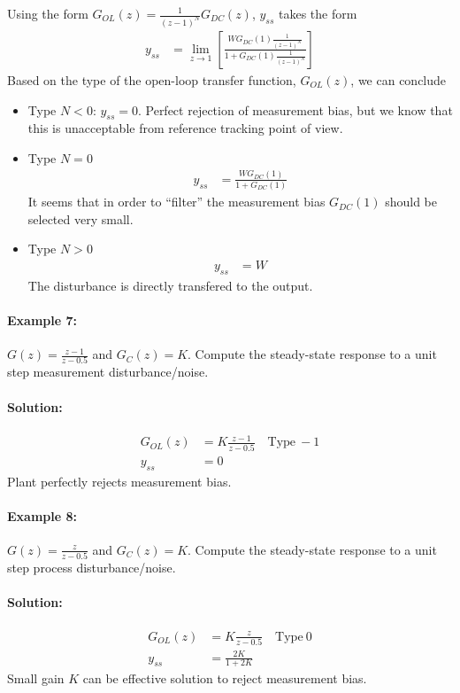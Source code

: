 \documentclass[twoside]{article}
\begin{document}
Using the form $G_{OL}(z) = \frac{1}{(z-1)^N} G_{DC}(z)$, $y_{ss}$
takes the form
%
\begin{align*}
  y_{ss} &= \lim_{z\to1} \left[ \frac{ W G_{DC}(1) \frac{1}{(z-1)^N}} {1 + G_{DC}(1) \frac{1}{(z-1)^N}}\right]  
\end{align*}
%
Based on the type of the open-loop transfer function, $G_{OL}(z)$,
we can conclude 
%
\begin{itemize}
 \item Type $N < 0$: $y_{ss} = 0$. Perfect rejection of measurement
   bias, but we know that this is unacceptable from reference tracking
   point of view.
 \item Type $N = 0$
%
\begin{align*}
  y_{ss} &= \frac{ W G_{DC}(1) } {1 + G_{DC}(1) } 
\end{align*}
%
It seems that in order to ``filter'' the measurement bias
$G_{DC}(1)$ should be selected very small.

\item Type $N > 0$
%
\begin{align*}
  y_{ss} &= W 
\end{align*}
%
The disturbance is directly transfered to the output. 

\end{itemize}
% 


\paragraph{Example 7:} $G(z) = \frac{z-1}{z-0.5}$ and $G_C(z) =
K$. Compute the steady-state response to a unit step
measurement disturbance/noise.

\paragraph{Solution:} 
%
\begin{align*}
G_{OL}(z) &= K \frac{z-1}{z-0.5} \quad \textrm{Type} \ -1
\\
y_{ss} &= 0
\end{align*}
%
Plant perfectly rejects measurement bias. 
%

\paragraph{Example 8:} $G(z) = \frac{z}{z-0.5}$ and $G_C(z) =
K$. Compute the steady-state response to a unit step
process disturbance/noise.

\paragraph{Solution:} 
%
\begin{align*}
G_{OL}(z) &= K \frac{z}{z-0.5} \quad \textrm{Type} \ 0
\\
y_{ss} &= \frac{ 2K  } {1 +2K } 
\end{align*}
%
Small gain $K$ can be effective solution to reject measurement bias.
%

\end{document}
